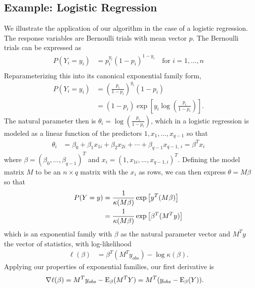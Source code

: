 \subsection{Example: Logistic Regression}
We illustrate the application of our algorithm in the case of a logistic regression.  The response variables are Bernoulli trials with mean vector $p$.  The Bernoulli trials can be expressed as   
\begin{align*}
	P( Y_i = y_i ) &= p_i^{y_i} ( 1- p_i)^{1-y_i}	\quad \text{for $i = 1, \ldots, n$} \\
\end{align*}
Reparameterizing this into its canonical exponential family form,
\begin{align*}
	P( Y_i = y_i ) &= \left( \frac{p_i}{1-p_i} \right )^{y_i} ( 1- p_i) \\
				  &  = (1-p_i) \exp \left [ y_i \log \left( \frac{p_i}{1-p_i} \right )     \right ].
\end{align*}
The natural parameter then is $\theta_i = \log \left( \frac{p_i}{1-p_i} \right )$, which in a logistic regression is modeled as a linear function of the predictors $1, x_1, \ldots, x_{q-1}$ so that
\begin{align*}
	\theta_i &= \beta_0 + \beta_1 x_{1i} + \beta_2 x_{2i} + \cdots + \beta_{q-1} x_{q-1,\,i} = \beta^T x_i
\end{align*}
where $\beta = (\beta_0, \ldots, \beta_{q-1} )^T$ and $x_i = ( 1, x_{1i}, \ldots, x_{q-1, i})^T$.  
Defining the model matrix $M$ to be an $n \times q$ matrix with the $x_i$ as rows, we can then express $\theta = M \beta$ so that 
\begin{align*}
	P( Y = y ) &= \frac{1}{\kappa (M\beta) } \exp \left [ y^T (M\beta) \right ] \notag \\
			&= \frac{1}{\kappa (M\beta) } \exp \left [ \beta^T (M^Ty) \right ]
\end{align*}
which is an exponential family with $\beta$ as the natural parameter vector and $M^T y$ the vector of statistics, with log-likelihood 
\begin{align*}
		 \ell(\beta) &=  \beta^T (M^T y_{obs}) - \log \kappa(\beta). 
\end{align*}
Applying our properties of exponential families, our first derivative is
\begin{align*}
	\nabla \ell( \beta ) &=  M^T y_{obs} - \operatorname{E}_{\beta}(M^TY) = M^T( y _{obs} - \operatorname{E}_{\beta}(Y) ).
\end{align*}

\vspace{0.70cm}

